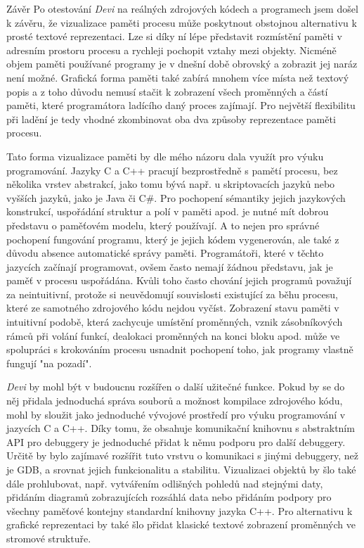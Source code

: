 \documentclass[bc,male,python,dept460]{diploma}						%
\newcommand{\parspace}[1][]{
	\ifthenelse{\isempty{#1}}{\vspace{5mm}}{\vspace{#1}}
	\par
}
\begin{document}
\begin{section}{Závěr}
\label{sec:Conclusion}
Po otestování \textit{Devi} na reálných zdrojových kódech a programech jsem došel k závěru, že vizualizace paměti procesu může poskytnout obstojnou
alternativu k prosté textové reprezentaci. Lze si díky ní lépe představit rozmístění paměti v adresním prostoru procesu a rychleji pochopit vztahy mezi objekty.
Nicméně objem paměti používané programy je v dnešní době obrovský a zobrazit jej naráz není možné. Grafická forma paměti také zabírá mnohem více místa než textový
popis a z toho důvodu nemusí stačit k zobrazení všech proměnných a částí paměti, které programátora ladícího daný proces zajímají. Pro největší flexibilitu
při ladění je tedy vhodné zkombinovat oba dva způsoby reprezentace paměti procesu.

\parspace Tato forma vizualizace paměti by dle mého názoru dala využít pro výuku programování. Jazyky C a C++ pracují bezprostředně s pamětí procesu,
bez několika vrstev abstrakcí, jako tomu bývá např. u skriptovacích jazyků nebo vyšších jazyků, jako je Java či C\#.
Pro pochopení sémantiky jejich jazykových konstrukcí, uspořádání struktur a polí v paměti apod. je nutné mít dobrou představu o paměťovém modelu,
který používají. A to nejen pro správné pochopení fungování programu, který je jejich kódem vygenerován, ale také z důvodu absence automatické správy paměti.
Programátoři, které v těchto jazycích začínají programovat, ovšem často nemají žádnou představu, jak je paměť v procesu uspořádána.
Kvůli toho často chování jejich programů považují za neintuitivní, protože si neuvědomují souvislosti existující za běhu procesu, které ze
samotného zdrojového kódu nejdou vyčíst. Zobrazení stavu paměti v intuitivní podobě, která zachycuje umístění proměnných, vznik zásobníkových rámců při volání
funkcí, dealokaci proměnných na konci bloku apod. může ve spolupráci s krokováním procesu usnadnit pochopení toho, jak programy vlastně fungují "na pozadí".

\parspace \textit{Devi} by mohl být v budoucnu rozšířen o další užitečné funkce. Pokud by se do něj přidala jednoduchá správa souborů a možnost kompilace
zdrojového kódu, mohl by sloužit jako jednoduché vývojové prostředí pro výuku programování v jazycích C a C++.
Díky tomu, že obsahuje komunikační knihovnu s abstraktním API pro debuggery je jednoduché přidat k němu podporu pro další debuggery. Určitě by bylo
zajímavé rozšířit tuto vrstvu o komunikaci s jinými debuggery, než je GDB, a srovnat jejich funkcionalitu a stabilitu.
Vizualizaci objektů by šlo také dále prohlubovat, např. vytvářením odlišných pohledů nad stejnými daty, přidáním diagramů zobrazujících rozsáhlá data nebo
přidáním podpory pro všechny paměťové kontejny standardní knihovny jazyka C++. Pro alternativu k grafické reprezentaci by také šlo přidat klasické textové
zobrazení proměnných ve stromové struktuře.
\end{section}
\end{document}
